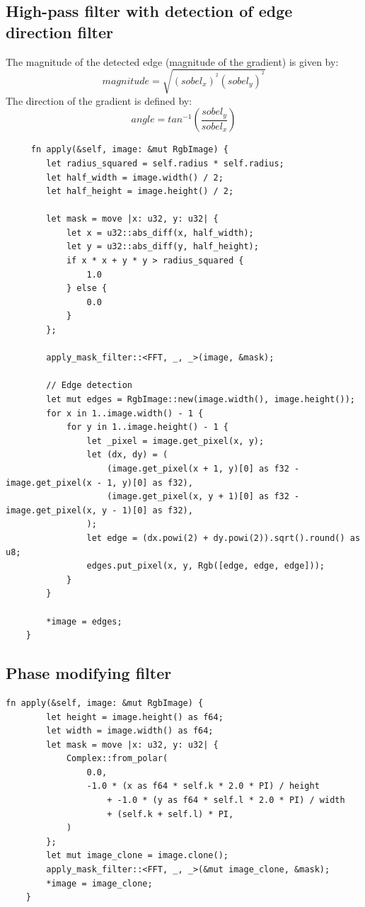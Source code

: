 \documentclass[12pt]{article}
\begin{document}
\subsection{High-pass filter with detection of edge direction filter}
The magnitude of the detected edge (magnitude of the gradient) is given by:
\begin{equation}
magnitude = \sqrt{\left ( sobel_x \right )^{^{2}}\left ( sobel_y \right )^{^{2}}}
\end{equation}
The direction of the gradient is defined by:
\begin{equation}
angle = tan^{-1}\left ( \frac{sobel_y}{sobel_x} \right )
\end{equation}
\begin{lstlisting}
     fn apply(&self, image: &mut RgbImage) {
        let radius_squared = self.radius * self.radius;
        let half_width = image.width() / 2;
        let half_height = image.height() / 2;

        let mask = move |x: u32, y: u32| {
            let x = u32::abs_diff(x, half_width);
            let y = u32::abs_diff(y, half_height);
            if x * x + y * y > radius_squared {
                1.0
            } else {
                0.0
            }
        };

        apply_mask_filter::<FFT, _, _>(image, &mask);

        // Edge detection
        let mut edges = RgbImage::new(image.width(), image.height());
        for x in 1..image.width() - 1 {
            for y in 1..image.height() - 1 {
                let _pixel = image.get_pixel(x, y);
                let (dx, dy) = (
                    (image.get_pixel(x + 1, y)[0] as f32 - image.get_pixel(x - 1, y)[0] as f32),
                    (image.get_pixel(x, y + 1)[0] as f32 - image.get_pixel(x, y - 1)[0] as f32),
                );
                let edge = (dx.powi(2) + dy.powi(2)).sqrt().round() as u8;
                edges.put_pixel(x, y, Rgb([edge, edge, edge]));
            }
        }

        *image = edges;
    }
\end{lstlisting}
\subsection{Phase modifying filter}
\begin{lstlisting}
fn apply(&self, image: &mut RgbImage) {
        let height = image.height() as f64;
        let width = image.width() as f64;
        let mask = move |x: u32, y: u32| {
            Complex::from_polar(
                0.0,
                -1.0 * (x as f64 * self.k * 2.0 * PI) / height
                    + -1.0 * (y as f64 * self.l * 2.0 * PI) / width
                    + (self.k + self.l) * PI,
            )
        };
        let mut image_clone = image.clone();
        apply_mask_filter::<FFT, _, _>(&mut image_clone, &mask);
        *image = image_clone;
    }
\end{lstlisting}
\end{document}

